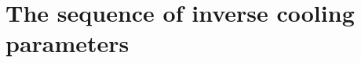 \documentclass[twocolumn,linenumbers]{aastex631}
\begin{document}
%







%
%
\appendix
\section{The sequence of inverse cooling parameters} \label{appendix:eta calculation}
\end{document}
